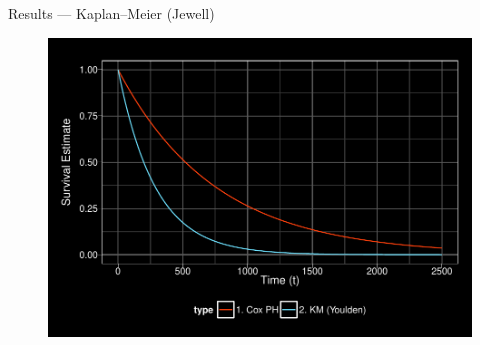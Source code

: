 \documentclass[12pt,t]{beamer}
\begin{document}
\begin{frame}[c]{Results --- Kaplan--Meier (Jewell)}

\begin{center}
\begin{figure}[H]
\begin{center}
\includegraphics[width=\textwidth]{Figs/s1_cox_youlden.pdf}
\end{center}
\label{fig:s1_cox_youlden}
\end{figure}
\end{center}

\note{
}

\end{frame}

\end{document}
